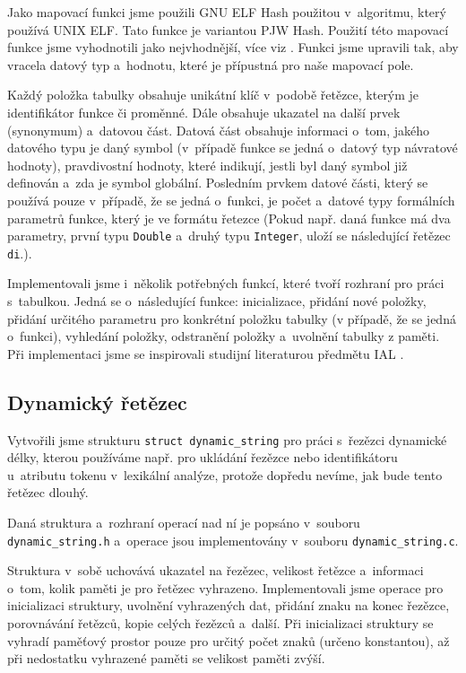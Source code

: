 \documentclass[a4paper, 11pt]{article}
\begin{document}
	Jako mapovací funkci jsme použili GNU ELF Hash použitou v~algoritmu, který používá UNIX ELF.
	Tato funkce je variantou PJW Hash. Použití této mapovací funkce jsme vyhodnotili jako nejvhodnější,
	více viz \cite{PJWHashFunction2017}. Funkci jsme upravili tak, aby vracela datový typ a~hodnotu,
	které je přípustná pro naše mapovací pole.

	Každý položka tabulky obsahuje unikátní klíč v~podobě řetězce, kterým je identifikátor funkce
	či proměnné. Dále obsahuje ukazatel na další prvek (synonymum) a~datovou část. Datová část obsahuje
	informaci o~tom, jakého datového typu je daný symbol (v~případě funkce se jedná o~datový typ
	návratové hodnoty), pravdivostní hodnoty, které indikují, jestli byl daný symbol již definován
	a~zda je symbol globální. Posledním prvkem datové části, který se používá pouze v~případě, že se
	jedná o~funkci, je počet a~datové typy formálních parametrů funkce, který je ve formátu řetezce
	(Pokud např. daná funkce má dva parametry, první typu \texttt{Double} a~druhý typu \texttt{Integer},
	uloží se následující řetězec \texttt{di}.).

	Implementovali jsme i~několik potřebných funkcí, které tvoří rozhraní pro práci s~tabulkou.
	Jedná se o~následující funkce: inicializace, přidání nové položky, přidání určitého parametru
	pro konkrétní položku tabulky (v případě, že se jedná o~funkci), vyhledání položky, odstranění
	položky a~uvolnění tabulky z paměti. Při implementaci jsme se inspirovali studijní literaturou
	předmětu IAL \cite{Honzik1991}.


	\subsection{Dynamický řetězec}

	Vytvořili jsme strukturu \texttt{struct dynamic\_string} pro práci s~řezězci dynamické délky, kterou používáme
	např. pro ukládání řezězce nebo identifikátoru u~atributu tokenu v~lexikální analýze, protože dopředu nevíme,
	jak bude tento řetězec dlouhý.

	Daná struktura a~rozhraní operací nad ní je popsáno v~souboru \texttt{dynamic\_string.h} a~operace jsou implementovány
	v~souboru \texttt{dynamic\_string.c}.

	Struktura v~sobě uchovává ukazatel na řezězec, velikost řetězce a~informaci o~tom, kolik paměti je pro
	řetězec vyhrazeno. Implementovali jsme operace pro inicializaci struktury, uvolnění vyhrazených dat,
	přidání znaku na konec řezězce, porovnávání řetězců, kopie celých řezězců a~další. Při inicializaci struktury
	se vyhradí paměťový prostor pouze pro určitý počet znaků (určeno konstantou), až při nedostatku vyhrazené
	paměti se velikost paměti zvýší.
\end{document}
